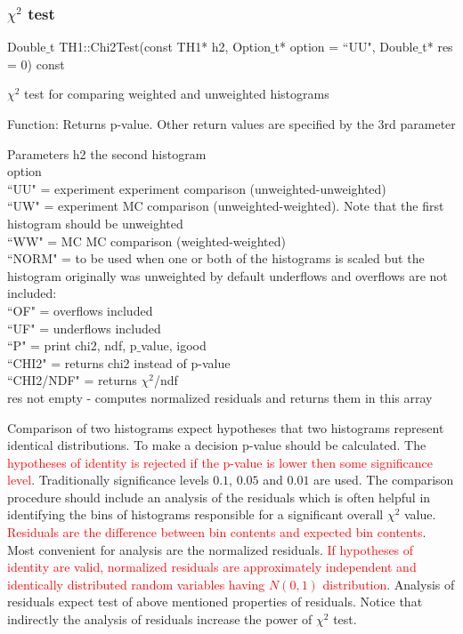 \documentclass[12pt,a4paper]{article}
\begin{document}
\subsubsection{$\chi^2$ test}
Double$\_$t TH1::Chi2Test(const TH1* h2, Option$\_$t* option = ``UU", Double$\_$t* res = 0) const 

$\chi^2$ test for comparing weighted and unweighted histograms

Function: Returns p-value. Other return values are specified by the 3rd parameter

Parameters
h2	the second histogram \\
option \\
``UU" = experiment experiment comparison (unweighted-unweighted) \\
``UW" = experiment MC comparison (unweighted-weighted). Note that the first histogram should be unweighted \\
``WW" = MC MC comparison (weighted-weighted) \\
``NORM" = to be used when one or both of the histograms is scaled but the histogram originally was unweighted by default underflows and overflows are not included: \\
``OF" = overflows included \\
``UF" = underflows included \\
``P" = print chi2, ndf, p$\_$value, igood \\
``CHI2" = returns chi2 instead of p-value \\
``CHI2/NDF" = returns $\chi^2$/ndf \\
res	not empty - computes normalized residuals and returns them in this array

Comparison of two histograms expect hypotheses that two histograms represent identical distributions. To make a decision p-value should be calculated. The \textcolor{red}{hypotheses of identity is rejected if the p-value is lower then some significance level}. Traditionally significance levels $0.1$, $0.05$ and $0.01$ are used. The comparison procedure should include an analysis of the residuals which is often helpful in identifying the bins of histograms responsible for a significant overall $\chi^2$ value. \textcolor{red}{Residuals are the difference between bin contents and expected bin contents}. Most convenient for analysis are the normalized residuals. \textcolor{red}{If hypotheses of identity are valid, normalized residuals are approximately independent and identically distributed random variables having $N(0,1)$ distribution}. Analysis of residuals expect test of above mentioned properties of residuals. Notice that indirectly the analysis of residuals increase the power of $\chi^2$ test.
\end{document}
